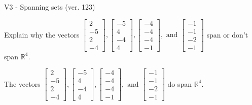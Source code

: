 \begin{exercise}
  \begin{exerciseTitle}V3 - Spanning sets (ver. 123)\end{exerciseTitle}
  \begin{exerciseStatement}
    Explain why the vectors \(\left[\begin{array}{r}
2 \\
-5 \\
2 \\
-4
\end{array}\right] , \left[\begin{array}{r}
-5 \\
4 \\
-4 \\
4
\end{array}\right] , \left[\begin{array}{r}
-4 \\
-4 \\
-4 \\
-1
\end{array}\right] , \text{ and } \left[\begin{array}{r}
-1 \\
-1 \\
-2 \\
-1
\end{array}\right]\) span or don't span \(\mathbb{R}^4\). 
	


  \end{exerciseStatement}
  \begin{exerciseAnswer}
   The vectors \(\left[\begin{array}{r}
2 \\
-5 \\
2 \\
-4
\end{array}\right] , \left[\begin{array}{r}
-5 \\
4 \\
-4 \\
4
\end{array}\right] , \left[\begin{array}{r}
-4 \\
-4 \\
-4 \\
-1
\end{array}\right] , \text{ and } \left[\begin{array}{r}
-1 \\
-1 \\
-2 \\
-1
\end{array}\right]\) 
  	 do  
	span \(\mathbb{R}^4\).
  


  \end{exerciseAnswer}
\end{exercise}
